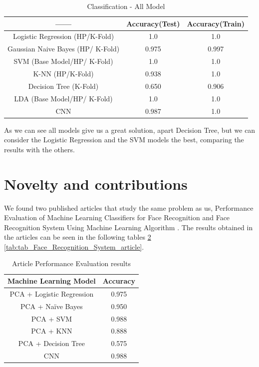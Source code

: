 \documentclass[conference]{IEEEtran}
\begin{document}
\begin{table}[ht!]
    \centering
    \caption{Classification - All Model} 
    \begin{tabular}{||c| c | c ||} 
    \hline
     ------ & Accuracy(Test) & Accuracy(Train) \\ [0.3ex] 
     \hline\hline
     Logistic Regression (HP/K-Fold) & 1.0 & 1.0\\
     \hline
    Gaussian Naive Bayes (HP/ K-Fold) & 0.975 &  0.997\\ 
    \hline
    SVM (Base Model/HP/ K-Fold) & 1.0 & 1.0 \\ 
    \hline
    K-NN (HP/K-Fold) & 0.938 & 1.0 \\ 
    \hline
    Decision Tree (K-Fold) & 0.650 & 0.906\\ 
    \hline
    LDA (Base Model/HP/ K-Fold) & 1.0 & 1.0\\ 
    \hline
    CNN  & 0.987 & 1.0\\ 
    \hline
    \end{tabular}
    \label{tab:tab_comp_final}
\end{table}

As we can see all models give us a great solution, apart Decision Tree, but we can consider the Logistic Regression and the SVM models the best, comparing the results with the others.

\section{Novelty and contributions}

We found two published articles that study the same problem as us, Performance Evaluation of Machine Learning Classifiers for Face Recognition \cite{9716171} and Face Recognition System Using Machine Learning Algorithm \cite{9137850}. The results obtained in the articles can be seen in the following tables \ref{tab:tab_performance_evaluation_article} \ref{tab:tab_Face_Recognition_System_article}.

\begin{table}[ht!]
    \centering
    \caption{Article Performance Evaluation results} 
    \begin{tabular}{||c| c ||} 
    \hline
     Machine Learning Model & Accuracy \\ [0.5ex] 
     \hline\hline
     PCA + Logistic Regression & 0.975 \\
     \hline
    PCA + Naïve Bayes & 0.950 \\ 
    \hline
    PCA + SVM & 0.988 \\ 
    \hline
    PCA + KNN & 0.888 \\ 
    \hline
    PCA + Decision Tree & 0.575\\ 
    \hline
    CNN & 0.988\\ 
    \hline
    \end{tabular}
    \label{tab:tab_performance_evaluation_article}
\end{table}
\end{document}
